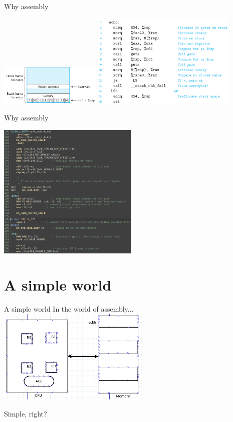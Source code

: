 \documentclass[UKenglish]{beamer}
\begin{document}
\begin{frame}{Why assembly}
  \begin{example}
    \includegraphics[width = \textwidth, height=2cm]{canary.png}
    \includegraphics[width = \textwidth, height=4.5cm]{canary_assembly.png}
  \end{example}
\end{frame}

\begin{frame}{Why assembly}
  \begin{example}
    \includegraphics[width = \textwidth, height=6.5cm]{context_switch.png}
  \end{example}
\end{frame}

\section{A simple world}
\begin{frame}{A simple world}
  In the world of assembly...
  \includegraphics[width = \textwidth, height=4.5cm]{simple.png}
  \begin{center}
   \Huge Simple, right?
  \end{center}
\end{frame}
\end{document}
